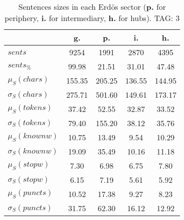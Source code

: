 \begin{table}[h!]
\begin{center}
\begin{tabular}{| l | c | c | c | c |}\hline
 & g. & p. & i. & h. \\\hline
$sents$ & 9254  & 1991  & 2870  & 4395 \\\hline
$sents_{\%}$ & 99.98  & 21.51  & 31.01  & 47.48 \\\hline
$\mu_S(chars)$ & 155.35  & 205.25  & 136.55  & 144.95 \\\hline
$\sigma_S(chars)$ & 275.71  & 501.60  & 149.61  & 173.17 \\\hline
$\mu_S(tokens)$ & 37.42  & 52.55  & 32.87  & 33.52 \\\hline
$\sigma_S(tokens)$ & 79.40  & 155.20  & 38.12  & 35.76 \\\hline
$\mu_S(knownw)$ & 10.75  & 13.49  & 9.54  & 10.29 \\\hline
$\sigma_S(knownw)$ & 19.09  & 35.49  & 10.16  & 11.18 \\\hline
$\mu_S(stopw)$ & 7.30  & 6.98  & 6.75  & 7.80 \\\hline
$\sigma_S(stopw)$ & 6.15  & 7.19  & 5.61  & 5.92 \\\hline
$\mu_S(puncts)$ & 10.52  & 17.38  & 9.27  & 8.23 \\\hline
$\sigma_S(puncts)$ & 31.75  & 62.30  & 16.12  & 12.92 \\\hline
\end{tabular}
\caption{Sentences sizes in each Erd\"os sector ({{\bf p.}} for periphery, {{\bf i.}} for intermediary, {{\bf h.}} for hubs). TAG: 3}
\end{center}
\end{table}